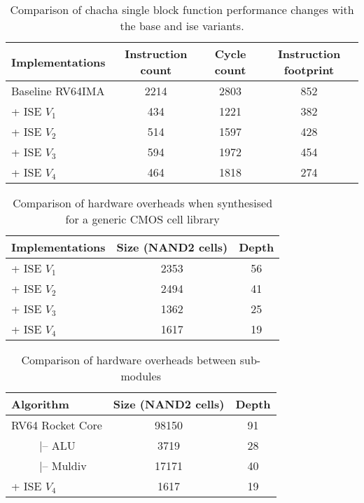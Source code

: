 
\begin{table}
\caption{Comparison of chacha single block function performance changes
with the base and ise variants.}
\label{tab:res:sw:perf}
\begin{tabular}{lccc}
\toprule            
Implementations        & Instruction count   & Cycle count & Instruction footprint\\

\midrule
Baseline RV64IMA       & 2214     & 2803  &  852 \\
           + ISE $V_1$ &  434     & 1221  &  382 \\
           + ISE $V_2$ &  514     & 1597  &  428 \\
           + ISE $V_3$ &  594     & 1972  &  454 \\
           + ISE $V_4$ &  464     & 1818  &  274 \\

\bottomrule
\end{tabular}
\end{table}


\begin{table}
\caption{Comparison of hardware overheads when synthesised for a
generic CMOS cell library}
\label{tab:res:sw:hardcost1}
\begin{tabular}{lcc}
\toprule            
Implementations        & Size (NAND2 cells)    & Depth  \\

\midrule
           + ISE $V_1$ &     2353     & 56   \\
           + ISE $V_2$ &     2494     & 41   \\
           + ISE $V_3$ &     1362     & 25   \\
           + ISE $V_4$ &     1617     & 19   \\

\bottomrule
\end{tabular}
\end{table}

\begin{table}
\caption{Comparison of hardware overheads between sub-modules}
\label{tab:res:sw:hardcost2}
\begin{tabular}{lcc}
\toprule            
Algorithm        &     Size (NAND2 cells)     & Depth \\

\midrule
RV64 Rocket Core &    98150     &   91  \\
~~~~~|-- ALU     &     3719     &   28  \\
~~~~~|-- Muldiv  &    17171     &   40  \\
+ ISE $V_4$      &     1617     &   19  \\ 

\bottomrule
\end{tabular}
\end{table}
